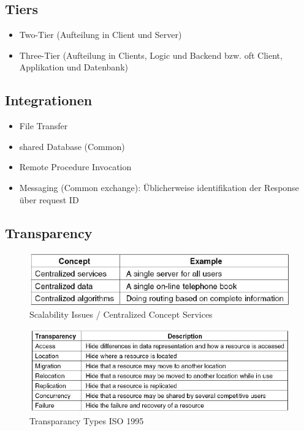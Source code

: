 \subsection{Tiers}

\begin{itemize}
	\item Two-Tier (Aufteilung in Client und Server)
	\item Three-Tier (Aufteilung in Clients, Logic und Backend bzw. oft Client, Applikation und Datenbank)
\end{itemize}

\subsection{Integrationen}

\begin{itemize}
\item File Transfer
\item shared Database (Common)
\item Remote Procedure Invocation
\item Messaging (Common exchange): Üblicherweise identifikation der Response über request ID
\end{itemize}

\subsection{Transparency}

\begin{figure}[h]
	\centering
	\includegraphics[width=0.7\linewidth]{img/centralized_concept_services}
	\caption{Scalability Issues / Centralized Concept Services}
	\label{fig:centralizedconceptservices}
\end{figure}


\begin{figure}[h]
	\centering
	\includegraphics[width=0.7\linewidth]{img/transparency_types}
	\caption{Transparancy Types ISO 1995}
	\label{fig:transparencytypes}
\end{figure}


